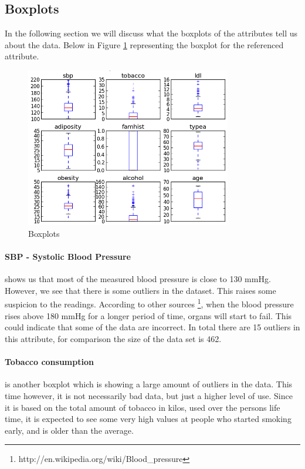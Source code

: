\subsection{Boxplots}
\label{boxplotSection}
In the following section we will discuss what the boxplots of the attributes tell us about the data.
Below in Figure \ref{boxplot} representing the boxplot for the referenced attribute.
\begin{figure}[h]
\centering
\includegraphics[width=9cm, keepaspectratio=true]{pictures/boxplot.png}
\caption{\footnotesize Boxplots}
\vspace{-.5cm}
\label{boxplot}
\end{figure}
\paragraph{SBP - Systolic Blood Pressure} shows us that most of the measured blood pressure is close to 130 mmHg. However, we see that there is some outliers in the dataset. This raises some suspicion to the readings. According to other sources \footnote{http://en.wikipedia.org/wiki/Blood\_pressure}, when the blood pressure rises above 180 mmHg for a longer period of time, organs will start to fail. This could indicate that some of the data are incorrect.
In total there are 15 outliers in this attribute, for comparison the size of the data set is 462.

\paragraph{Tobacco consumption} is another boxplot which is showing a large amount of outliers in the data. This time however, it is not necessarily bad data, but just a higher level of use. Since it is based on the total amount of tobacco in kilos, used over the persons life time, it is expected to see some very high values at people who started smoking early, and is older than the average.

